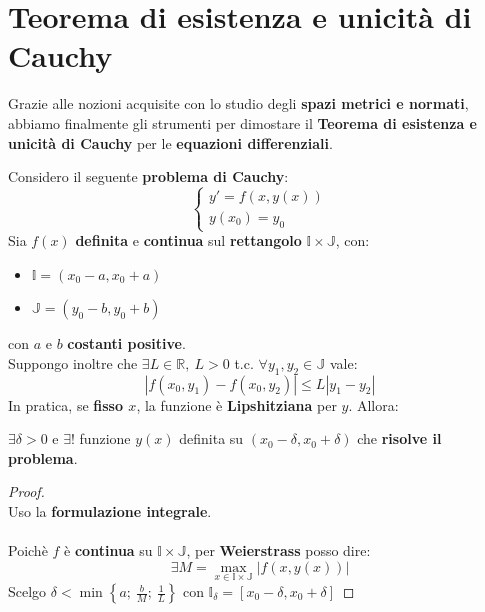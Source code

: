 \documentclass[a4paper, oneside]{article}
\newcommand\R{\mathbb{R}}
\newcommand\I{\mathbb{I}}
\newcommand\J{\mathbb{J}}
\begin{document}
\newpage

\section{Teorema di esistenza e unicità di Cauchy}
Grazie alle nozioni acquisite con lo studio degli \textbf{spazi metrici e normati}, abbiamo finalmente gli strumenti
per dimostare il \textbf{Teorema di esistenza e unicità di Cauchy} per le \textbf{equazioni differenziali}.

\begin{theorem}
    Considero il seguente \textbf{problema di Cauchy}:
    \[\begin{cases}
        y'=f\left(x,y(x)\right) \\
        y(x_0)=y_0
    \end{cases}\]
    Sia $f(x)$ \textbf{definita} e \textbf{continua} sul \textbf{rettangolo} $\I\times\J$, con:
    \begin{itemize}
        \item $\I=(x_0-a,x_0+a)$
        \item $\J=(y_0-b,y_0+b)$
    \end{itemize}
    con $a$ e $b$ \textbf{costanti positive}.\\
    Suppongo inoltre che $\exists L\in\R, \ L>0$ t.c. $\forall y_1,y_2\in\J$ vale:
    \[\left|f(x_0,y_1)-f(x_0,y_2)\right|\leq L \left|y_1-y_2\right|\]
    In pratica, se \textbf{fisso $x$}, la funzione è \textbf{Lipshitziana} per $y$. Allora:
    \begin{center}
        $\exists\delta >0$ e $\exists !$ funzione $y(x)$ definita su $(x_0 - \delta,x_0 + \delta)$ che \textbf{risolve il problema}.
    \end{center}

    \begin{proof}\hfill\\
        Uso la \textbf{formulazione integrale}. \\\\
        \noindent Poichè $f$ è \textbf{continua} su $\I\times\J$, per \textbf{Weierstrass} posso dire:
        \[\exists M = \max_{x\in\I\times\J} \left|f\left(x,y(x)\right)\right|\]
        Scelgo $\delta < \min\left\{a; \ \frac{b}{M}; \ \frac{1}{L}\right\}$ con $\I_{\delta} = \left[x_0-\delta,x_0+\delta\right]$


\end{proof}
\end{theorem}
\end{document}
